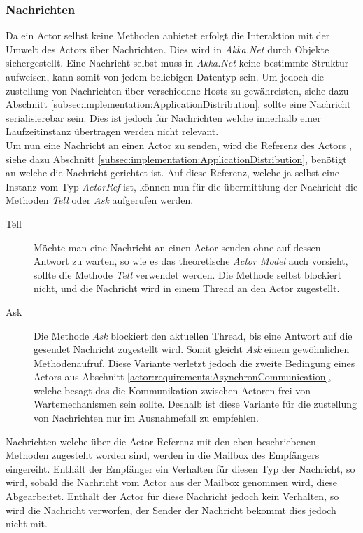 \subsubsection{Nachrichten}\label{subsec:implementation:akkaMessaging}
Da ein Actor selbst keine Methoden anbietet erfolgt die Interaktion mit der Umwelt des Actors über Nachrichten. Dies wird in \textit{Akka.Net} durch Objekte sichergestellt. Eine Nachricht selbst muss in \textit{Akka.Net} keine bestimmte Struktur aufweisen, kann somit von jedem beliebigen Datentyp sein. Um jedoch die zustellung von Nachrichten über verschiedene Hosts zu gewähreisten, siehe dazu Abschnitt \ref{subsec:implementation:ApplicationDistribution}, sollte eine Nachricht serialisierebar sein. Dies ist jedoch für Nachrichten welche innerhalb einer Laufzeitinstanz übertragen werden nicht relevant. \\
Um nun eine Nachricht an einen Actor zu senden, wird die Referenz des Actors , siehe dazu Abschnitt \ref{subsec:implementation:ApplicationDistribution}, benötigt an welche die Nachricht gerichtet ist. Auf diese Referenz, welche ja selbst eine Instanz vom Typ \textit{ActorRef} ist, können nun für die übermittlung der Nachricht die Methoden \textit{Tell} oder \textit{Ask} aufgerufen werden.
\begin{description}
    \item[Tell] Möchte man eine Nachricht an einen Actor senden ohne auf dessen Antwort zu warten, so wie es das theoretische \textit{Actor Model} auch vorsieht, sollte die Methode \textit{Tell} verwendet werden. Die Methode selbst blockiert nicht, und die Nachricht wird in einem Thread an den Actor zugestellt. 
    \item[Ask] Die Methode \textit{Ask} blockiert den aktuellen Thread, bis eine Antwort auf die gesendet Nachricht zugestellt wird. Somit gleicht \textit{Ask} einem gewöhnlichen Methodenaufruf. Diese Variante verletzt jedoch die zweite Bedingung eines Actors aus Abschnitt \ref{actor:requirements:AsynchronCommunication}, welche besagt das die Kommunikation zwischen Actoren frei von Wartemechanismen sein sollte. Deshalb ist diese Variante für die zustellung von Nachrichten nur im Ausnahmefall zu empfehlen.  
\end{description}
Nachrichten welche über die Actor Referenz mit den eben beschriebenen Methoden zugestellt worden sind, werden in die Mailbox des Empfängers eingereiht. Enthält der Empfänger ein Verhalten für diesen Typ der Nachricht, so wird, sobald die Nachricht vom Actor aus der Mailbox genommen wird, diese Abgearbeitet. Enthält der Actor für diese Nachricht jedoch kein Verhalten, so wird die Nachricht verworfen, der Sender der Nachricht bekommt dies jedoch nicht mit. 


